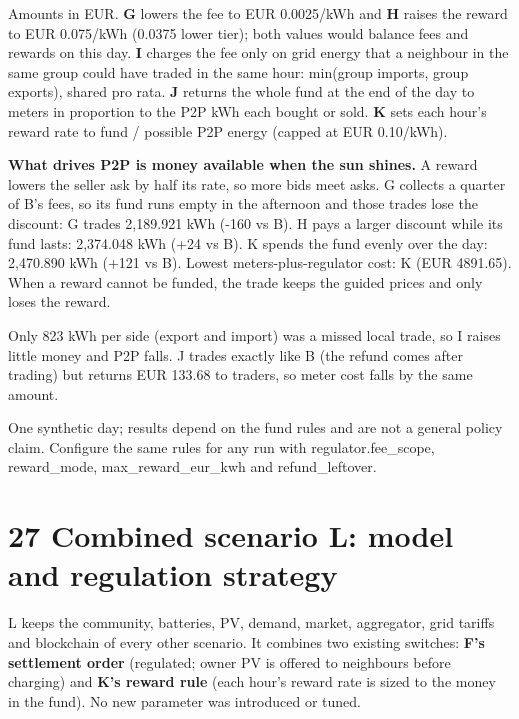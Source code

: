 \documentclass[a4paper,11pt]{article}
\begin{document}
Amounts in EUR. \textbf{G} lowers the fee to EUR 0.0025/kWh and \textbf{H} raises the reward to EUR 0.075/kWh (0.0375 lower tier); both values would balance fees and rewards on this day. \textbf{I} charges the fee only on grid energy that a neighbour in the same group could have traded in the same hour: min(group imports, group exports), shared pro rata. \textbf{J} returns the whole fund at the end of the day to meters in proportion to the P2P kWh each bought or sold. \textbf{K} sets each hour's reward rate to fund / possible P2P energy (capped at EUR 0.10/kWh).
\par\medskip

\textbf{What drives P2P is money available when the sun shines.} A reward lowers the seller ask by half its rate, so more bids meet asks. G collects a quarter of B's fees, so its fund runs empty in the afternoon and those trades lose the discount: G trades 2,189.921 kWh (-160 vs B). H pays a larger discount while its fund lasts: 2,374.048 kWh (+24 vs B). K spends the fund evenly over the day: 2,470.890 kWh (+121 vs B). Lowest meters-plus-regulator cost: K (EUR 4891.65). When a reward cannot be funded, the trade keeps the guided prices and only loses the reward.
\par\medskip

Only 823 kWh per side (export and import) was a missed local trade, so I raises little money and P2P falls. J trades exactly like B (the refund comes after trading) but returns EUR 133.68 to traders, so meter cost falls by the same amount.
\par\medskip

{\small One synthetic day; results depend on the fund rules and are not a general policy claim. Configure the same rules for any run with regulator.fee\_scope, reward\_mode, max\_reward\_eur\_kwh and refund\_leftover.\par}
\par\medskip

\clearpage

\section*{27  Combined scenario L: model and regulation strategy}
\par\medskip

L keeps the community, batteries, PV, demand, market, aggregator, grid tariffs and blockchain of every other scenario. It combines two existing switches: \textbf{F's settlement order} (regulated; owner PV is offered to neighbours before charging) and \textbf{K's reward rule} (each hour's reward rate is sized to the money in the fund). No new parameter was introduced or tuned.
\par\medskip
\end{document}
